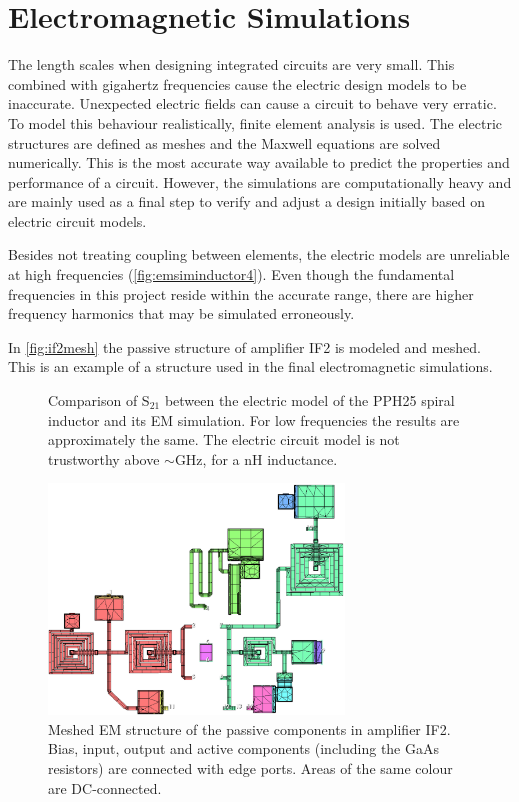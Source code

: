 \chapter{Electromagnetic Simulations}\label{app:emsim}
		The length scales when designing integrated circuits are very small. This combined with gigahertz frequencies cause the electric design models to be inaccurate. Unexpected electric fields can cause a circuit to behave very erratic. To model this behaviour realistically, finite element analysis is used. The electric structures are defined as meshes and the Maxwell equations are solved numerically. This is the most accurate way available to predict the properties and performance of a circuit. However, the simulations are computationally heavy and are mainly used as a final step to verify and adjust a design initially based on electric circuit models.

		Besides not treating coupling between elements, the electric models are unreliable at high frequencies (\autoref{fig:emsiminductor4}). Even though the fundamental frequencies in this project reside within the accurate range, there are higher frequency harmonics that may be simulated erroneously.

		In \autoref{fig:if2mesh} the passive structure of amplifier IF2 is modeled and meshed. This is an example of a structure used in the final electromagnetic simulations.

		\begin{figure}[hpt!]
			\centering
			\caption[EM simulation of the UMS PPH25 spiral inductor.]{Comparison of S$_{21}$ between the electric model of the PPH25 spiral inductor and its EM simulation. For low frequencies the results are approximately the same. The electric circuit model is not trustworthy above $\sim$\unit[12]{GHz}, for a \unit[4]{nH} inductance.}\label{fig:emsiminductor4}
		\end{figure}

		\begin{figure}[hpt!]
			\centering
			\includegraphics[width=0.7\textwidth]{fig/emsim/if2mesh}
			\caption[EM mesh of amplifier IF2.]{Meshed EM structure of the passive components in amplifier IF2. Bias, input, output and active components (including the GaAs resistors) are connected with edge ports. Areas of the same colour are DC-connected.}\label{fig:if2mesh}
		\end{figure}
